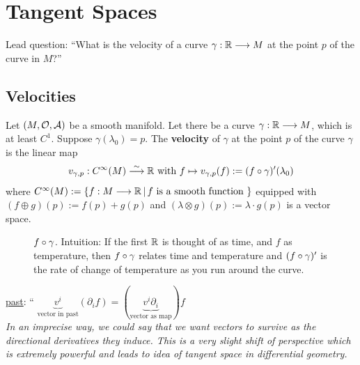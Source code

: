 \section{Tangent Spaces}
Lead question: ``What is the velocity of a curve $\gamma : \mathbb{R} \longrightarrow M$ at the point $p$ of the curve in $M$?''

\subsection{Velocities}
\begin{definition} Let $(M, \mathcal{O}, \mathcal{A})$ be a smooth manifold. Let there be a curve $\gamma : \mathbb{R} \longrightarrow M$, which is at least $C^1$. Suppose $\gamma(\lambda_0) =p$. The \textbf{velocity} of $\gamma$ at the point $p$ of the curve $\gamma$ is the linear map \\
\begin{equation}\label{eq_velocity}
v_{\gamma, p} : C^{\infty}(M) \stackrel{\sim}{\longrightarrow} \mathbb{R} \text{ with }
f \mapsto v_{\gamma,p}(f):= (f \circ \gamma)^{\prime}(\lambda_0)
\end{equation}
where $C^{\infty}(M) := \lbrace f: M \longrightarrow \mathbb{R} \, | \, f \text{ is a smooth function } \rbrace$ equipped with \\
$(f \oplus g)(p) := f(p) + g(p)$ and $(\lambda \otimes g)(p) := \lambda \cdot g(p)$ is a vector space.
\end{definition}

\begin{figure}
\label{fig:L5_fAfterGamma}
  \centering
    \caption{$f \circ \gamma$. Intuition: If the first $\mathbb{R}$ is thought of as time, and $f$ as temperature, then $f \circ \gamma$ relates time and temperature and $(f \circ \gamma)^\prime$ is the rate of change of temperature as you run around the curve.}
\end{figure}

\underline{past}: `` $\underbrace{v^i}_{\text{vector in past}} (\partial_i f) = (\underbrace{v^i \partial_i}_{\text{vector as map}})f$ \\
\textit{In an imprecise way, we could say that we want vectors to survive as the directional derivatives they induce. This is a very slight shift of perspective which is extremely powerful and leads to idea of tangent space in differential geometry.}

